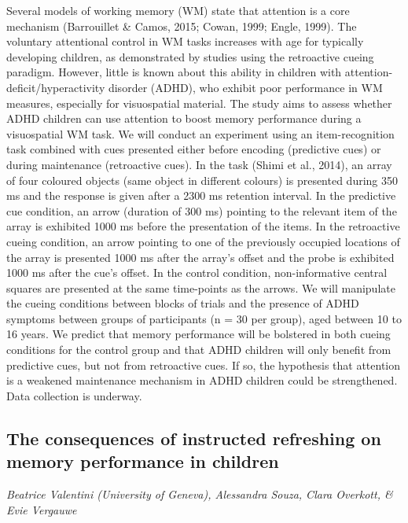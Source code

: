 \documentclass[
  12pt,
]{book}
\begin{document}
Several models of working memory (WM) state that attention is a core mechanism (Barrouillet \& Camos, 2015; Cowan, 1999; Engle, 1999). The voluntary attentional control in WM tasks increases with age for typically developing children, as demonstrated by studies using the retroactive cueing paradigm. However, little is known about this ability in children with attention-deficit/hyperactivity disorder (ADHD), who exhibit poor performance in WM measures, especially for visuospatial material. The study aims to assess whether ADHD children can use attention to boost memory performance during a visuospatial WM task. We will conduct an experiment using an item-recognition task combined with cues presented either before encoding (predictive cues) or during maintenance (retroactive cues). In the task (Shimi et al., 2014), an array of four coloured objects (same object in different colours) is presented during 350 ms and the response is given after a 2300 ms retention interval. In the predictive cue condition, an arrow (duration of 300 ms) pointing to the relevant item of the array is exhibited 1000 ms before the presentation of the items. In the retroactive cueing condition, an arrow pointing to one of the previously occupied locations of the array is presented 1000 ms after the array's offset and the probe is exhibited 1000 ms after the cue's offset. In the control condition, non-informative central squares are presented at the same time-points as the arrows. We will manipulate the cueing conditions between blocks of trials and the presence of ADHD symptoms between groups of participants (n = 30 per group), aged between 10 to 16 years. We predict that memory performance will be bolstered in both cueing conditions for the control group and that ADHD children will only benefit from predictive cues, but not from retroactive cues. If so, the hypothesis that attention is a weakened maintenance mechanism in ADHD children could be strengthened. Data collection is underway.

\hypertarget{the-consequences-of-instructed-refreshing-on-memory-performance-in-children}{%
\subsection{The consequences of instructed refreshing on memory performance in children}\label{the-consequences-of-instructed-refreshing-on-memory-performance-in-children}}

\emph{Beatrice Valentini (University of Geneva), Alessandra Souza, Clara Overkott, \& Evie Vergauwe}
\end{document}
